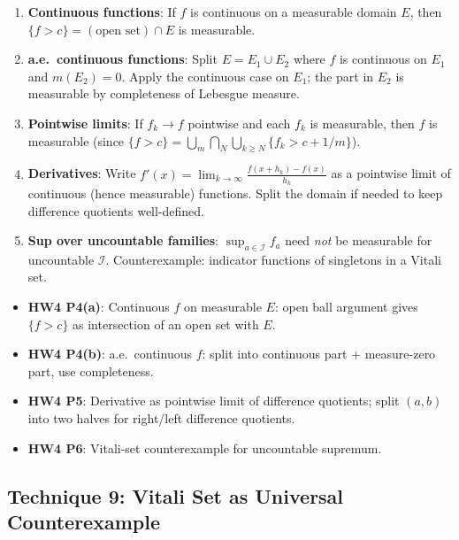 \documentclass[11pt]{report}
\begin{document}
\begin{rembox}[Strategy]
\begin{enumerate}[label=(\roman*)]
\item \textbf{Continuous functions}: If $f$ is continuous on a measurable domain $E$, then $\{f > c\} = (\text{open set}) \cap E$ is measurable.
\item \textbf{a.e.\ continuous functions}: Split $E = E_1 \cup E_2$ where $f$ is continuous on $E_1$ and $m(E_2) = 0$. Apply the continuous case on $E_1$; the part in $E_2$ is measurable by completeness of Lebesgue measure.
\item \textbf{Pointwise limits}: If $f_k \to f$ pointwise and each $f_k$ is measurable, then $f$ is measurable (since $\{f > c\} = \bigcup_m \bigcap_N \bigcup_{k \geq N} \{f_k > c + 1/m\}$).
\item \textbf{Derivatives}: Write $f'(x) = \lim_{k \to \infty} \frac{f(x + h_k) - f(x)}{h_k}$ as a pointwise limit of continuous (hence measurable) functions. Split the domain if needed to keep difference quotients well-defined.
\item \textbf{Sup over uncountable families}: $\sup_{a \in \mathcal{I}} f_a$ need \textit{not} be measurable for uncountable $\mathcal{I}$. Counterexample: indicator functions of singletons in a Vitali set.
\end{enumerate}
\end{rembox}

\begin{exbox}[Applications (HW4)]
\begin{itemize}
\item \textbf{HW4 P4(a)}: Continuous $f$ on measurable $E$: open ball argument gives $\{f > c\}$ as intersection of an open set with $E$.
\item \textbf{HW4 P4(b)}: a.e.\ continuous $f$: split into continuous part + measure-zero part, use completeness.
\item \textbf{HW4 P5}: Derivative as pointwise limit of difference quotients; split $(a,b)$ into two halves for right/left difference quotients.
\item \textbf{HW4 P6}: Vitali-set counterexample for uncountable supremum.
\end{itemize}
\end{exbox}

\subsection{Technique 9: Vitali Set as Universal Counterexample}
\end{document}
